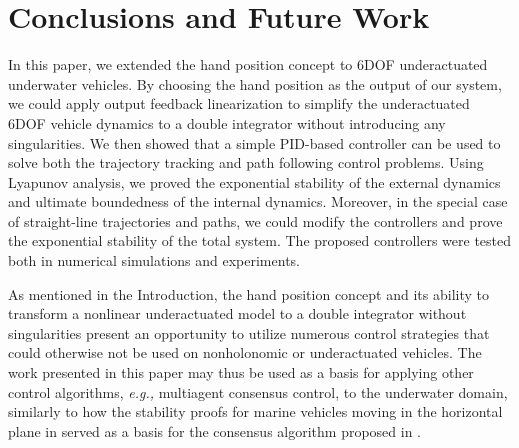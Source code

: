 \section{Conclusions and Future Work}
\label{sec:handpos_trajectory_conclusions}
In this paper, we extended the hand position concept to 6DOF underactuated underwater vehicles.
By choosing the hand position as the output of our system, we could apply output feedback linearization to simplify the underactuated 6DOF vehicle dynamics to a double integrator without introducing any singularities. %
We then showed that a simple PID-based controller can be used to solve both the trajectory tracking and path following control problems.
Using Lyapunov analysis, we proved the exponential stability of the external dynamics and ultimate boundedness of the internal dynamics.
Moreover, in the special case of straight-line trajectories and paths, we could modify the controllers and prove the exponential stability of the total system.
The proposed controllers were tested both in numerical simulations and experiments.

As mentioned in the Introduction, the hand position concept and its ability to transform a nonlinear underactuated model to a double integrator without singularities present an opportunity to utilize numerous control strategies that could otherwise not be used on nonholonomic or underactuated vehicles.
The work presented in this paper may thus be used as a basis for applying other control algorithms, \emph{e.g.,} multiagent consensus control, to the underwater domain, similarly to how the stability proofs for marine vehicles moving in the horizontal plane in \cite{paliotta_trajectory_2019} served as a basis for the consensus algorithm proposed in \cite{restrepo_tracking-formation_2022}.
